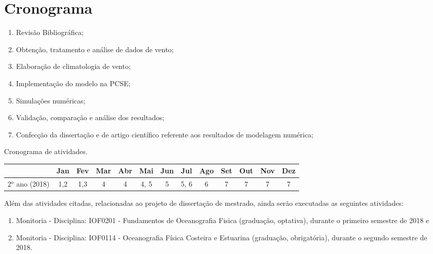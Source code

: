 \chapter{Cronograma}
\label{cha:schedule}

\begin{enumerate}
    \item Revisão Bibliográfica;
    \item Obtenção, tratamento e análise de dados de vento;
    \item Elaboração de climatologia de vento;
    \item Implementação do modelo na PCSE;
    \item Simulações numéricas;
    \item Validação, comparação e análise dos resultados;
    \item Confecção da dissertação e de artigo científico referente aos resultados
    de modelagem numérica;
\end{enumerate}

\begin{tablehere}
\centering
\caption{Cronograma de atividades.}
\label{my-label}
\begin{tabular}{|c|c|c|c|c|c|c|c|c|c|c|c|c|}
\hline
\textbf{}     & Jan & Fev & Mar & Abr & Mai    & Jun & Jul    & Ago   & Set & Out & Nov & Dez   \\ \hline
2$^o$ ano (2018) & 1,2 & 1,3 & 4  & 4  & 4, 5 & 5  & 5, 6 & 6    & 7  & 7  & 7  & 7    \\ \hline
\end{tabular}
\end{tablehere}
\bigskip

Além das atividades citadas, relacionadas ao projeto de dissertação de mestrado, ainda serão executadas as seguintes atividades:

\begin{enumerate}
    \item Monitoria - Disciplina: IOF0201 - Fundamentos de Oceanografia Fisica (graduação, optativa), durante o primeiro semestre de 2018 e
    \item Monitoria - Disciplina: IOF0114 - Oceanografia Física Costeira e Estuarina (graduação, obrigatória), durante o segundo semestre de 2018.
\end{enumerate}